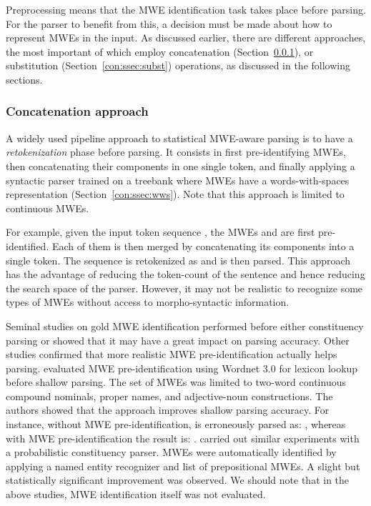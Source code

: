 \documentclass[output=paper]{langsci/langscibook}
\begin{document}
Preprocessing means that the MWE identification task takes place before parsing. For the parser to benefit from this, a decision must be made about how to represent MWEs in the input. As discussed earlier, there are different approaches, the most important of which  employ concatenation (Section~\ref{con:ssec:concat}), or substitution (Section~\ref{con:ssec:subst}) operations, as discussed in the following sections.

\subsubsection{Concatenation approach}
\label{con:ssec:concat}

A widely used pipeline approach to statistical MWE-aware parsing is to have a \emph{retokenization} phase before parsing. It consists in first pre-identifying MWEs, then concatenating their components in one single token, and finally applying  a syntactic parser trained on a treebank where MWEs have a words-with-spaces representation (Section~\ref{con:ssec:wws}). Note that this approach is limited to continuous MWEs. 

For example, given the input token sequence , the MWEs  and  are first pre-identified. Each of them is then merged by concatenating its components into a single token. The sequence is retokenized as  and is then parsed.
This approach has the advantage of reducing the token-count of the sentence and hence reducing the search space of the parser. However, it may not be realistic to recognize some types of MWEs without access to morpho-syntactic information.

Seminal studies 
on gold MWE identification performed before either consti\-tuency parsing \citep{arun05} or  \citep{nivre04,eryigit:2011:multiword} showed that it may have a great impact on parsing accuracy.
Other studies confirmed that more realistic MWE pre-identification actually helps parsing. 
\citet{korkontzelosetal2010} evaluated MWE pre-identification using Wordnet 3.0 for lexicon lookup before shallow parsing. The set of MWEs was limited to two-word continuous compound nominals, proper names, and adjective-noun constructions. The authors showed that the approach improves shallow parsing accuracy. For instance, 
without  MWE pre-identification,
 is erroneously parsed as: , whereas with MWE pre-identification the result is: . \citet{cafferkey07} carried out similar experiments with a probabilistic constituency parser. MWEs were automatically identified by applying a named entity recognizer and list of prepositional MWEs. A slight but statistically significant improvement was observed. We should note that in the above studies, MWE identification itself was not evaluated. 
\end{document}
